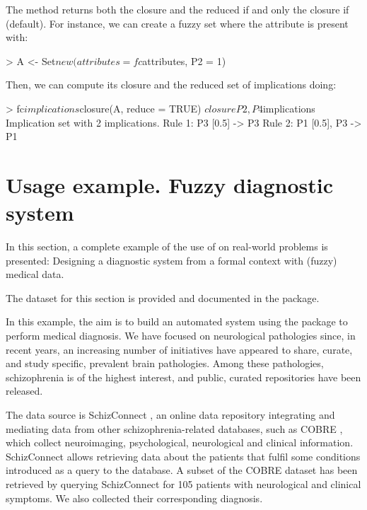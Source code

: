 The  method returns both the closure and the reduced
 if  and only the closure if
 (default). For instance, we can create a fuzzy set
where the attribute  is present with:

\begin{example}
> A <- Set$new(attributes = fc$attributes, P2 = 1)
\end{example}

Then, we can compute its closure and the reduced set of implications
doing:

\begin{example}
> fc$implications$closure(A, reduce = TRUE)
$closure
{P2, P4}

$implications
Implication set with 2 implications.
Rule 1: {P3 [0.5]} -> {P3}
Rule 2: {P1 [0.5], P3} -> {P1}
\end{example}

\hypertarget{examples}{%
\section{Usage example. Fuzzy diagnostic system}\label{examples}}

In this section, a complete example of the use of  on
real-world problems is presented: Designing a diagnostic system from a
formal context with (fuzzy) medical data.

The dataset for this section is provided and documented in the package.

In this example, the aim is to build an automated system using the
 package to perform medical diagnosis. We have focused on
neurological pathologies since, in recent years, an increasing number of
initiatives have appeared to share, curate, and study specific,
prevalent brain pathologies. Among these pathologies, schizophrenia is
of the highest interest, and public, curated repositories have been
released.

The data source is SchizConnect \citep{wang2016schizconnect}, an online
data repository integrating and mediating data from other
schizophrenia-related databases, such as COBRE
\citep{aine2017multimodal}, which collect neuroimaging, psychological,
neurological and clinical information. SchizConnect allows retrieving
data about the patients that fulfil some conditions introduced as a
query to the database. A subset of the COBRE dataset has been retrieved
by querying SchizConnect for 105 patients with neurological and clinical
symptoms. We also collected their corresponding diagnosis.

